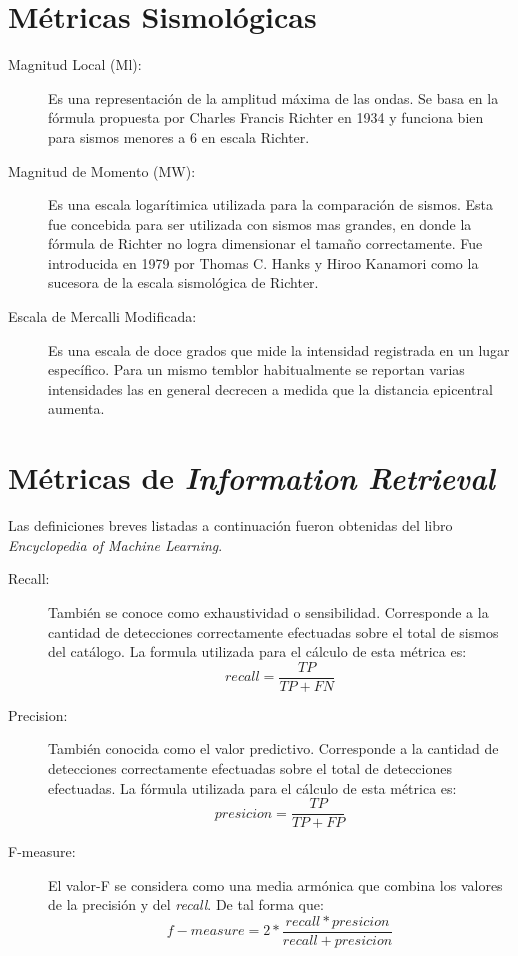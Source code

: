 \section{Métricas Sismológicas}
\label{sec:metricassis}
\begin{description}
\item[Magnitud Local (Ml):] Es una representación de la amplitud máxima de las ondas. Se basa en la fórmula propuesta por Charles Francis Richter en 1934 y funciona bien para sismos menores a 6 en escala Richter.\cite{csnglosary}

\item[Magnitud de Momento (MW):] Es una escala logarítimica utilizada para la comparación de sismos. Esta fue concebida para ser utilizada con sismos mas grandes, en donde la fórmula de Richter no logra dimensionar el tamaño correctamente. Fue introducida en 1979 por Thomas C. Hanks y Hiroo Kanamori como la sucesora de la escala sismológica de Richter.\cite{csnglosary}

\item[Escala de Mercalli Modificada:] Es una escala de doce grados que mide la intensidad registrada en un lugar específico. Para un mismo temblor habitualmente se reportan varias intensidades las en general decrecen a medida que la distancia epicentral aumenta.\cite{csnglosary}
\end{description}

\section{Métricas de \textit{Information Retrieval}}
\label{sec:metricasir}

Las definiciones breves listadas a continuación fueron obtenidas del libro \textit{Encyclopedia of Machine Learning}\cite{encyclopediaml}.

\begin{description}
\item[Recall:] También se conoce como exhaustividad o sensibilidad. Corresponde a la cantidad de detecciones correctamente efectuadas sobre el total de sismos del catálogo. La formula utilizada para el cálculo de esta métrica es:  
\[recall = \frac{TP}{TP + FN}\]

\item[Precision:] También conocida como el valor predictivo. Corresponde a la cantidad de detecciones correctamente efectuadas sobre el total de detecciones efectuadas. La fórmula utilizada para el cálculo de esta métrica es: 
\[presicion = \frac{TP}{TP + FP}\]

\item[F-measure:] El valor-F se considera como una media armónica que combina los valores de la precisión y del \textit{recall}. De tal forma que: 
\[f-measure = 2*\frac{recall * presicion}{recall + presicion}\]
\end{description}



